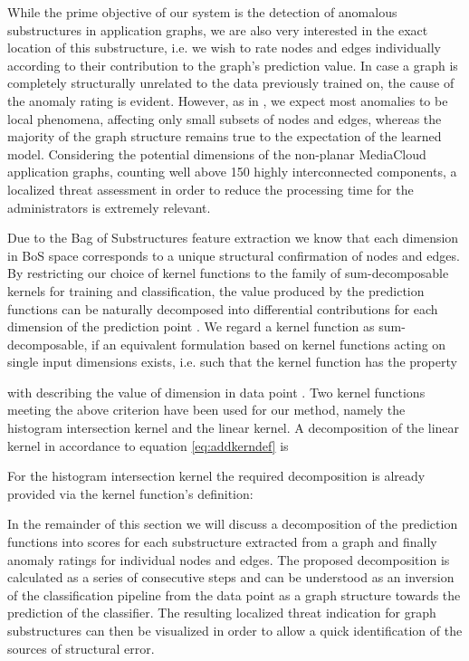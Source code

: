\documentclass{llncs}
\begin{document}
While the prime objective of our system is the detection of anomalous substructures in application graphs, we are also very interested in the exact location of this substructure, i.e. we wish to rate nodes and edges individually according to their contribution to the graph's prediction value.
In case a graph is completely structurally unrelated to the data previously trained on, the cause of the anomaly rating is evident. However, as in \cite{eberle2007mining}, we expect most anomalies to be local phenomena, affecting only small subsets of nodes and edges, whereas the majority of the graph structure remains true to the expectation of the learned model. Considering the potential dimensions of the non-planar MediaCloud application graphs, counting well above 150 highly interconnected components, a localized threat assessment in order to reduce the processing time for the administrators is extremely relevant.

Due to the Bag of Substructures feature extraction we know that each dimension in BoS space corresponds to a unique structural confirmation of nodes and edges. By restricting our choice of kernel functions to the family of sum-decomposable kernels for training and classification, the value produced by the prediction functions  can be naturally decomposed into differential contributions for each dimension  of the prediction point .
We regard a kernel function as sum-decomposable, if an equivalent formulation based on kernel functions acting on single input dimensions exists, i.e. such that the kernel function has the property

with  describing the value of dimension  in data point .
Two kernel functions meeting the above criterion have been used for our method, namely the histogram intersection kernel and the linear kernel. A decomposition of the linear kernel in accordance to equation \eqref{eq:addkerndef} is


For the histogram intersection kernel the required decomposition is already provided via the kernel function's definition:


In the remainder of this section we will discuss a decomposition of the prediction functions  into scores for each substructure extracted from a graph and finally anomaly ratings for individual nodes and edges. The proposed decomposition is calculated as a series of consecutive steps and can be understood as an inversion of the classification pipeline from the data point as a graph structure towards the prediction of the classifier. The resulting localized threat indication for graph substructures can then be visualized in order to allow a quick identification of the sources of structural error. 
\end{document}
